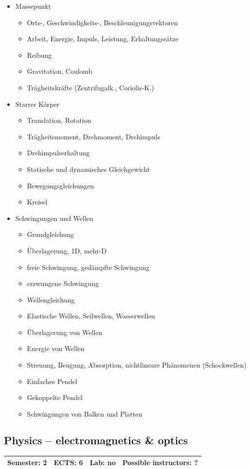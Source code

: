\documentclass[12pt,twoside,fleqn,a4paper]{article}
\begin{document}
\begin{itemize}
\setlength\itemsep{0cm}
\item Massepunkt
\begin{itemize}
\item Orts-, Geschwindigkeits-, Beschleunigungsvektoren
\item Arbeit, Energie, Impuls, Leistung, Erhaltungssätze
\item Reibung
\item Gravitation, Coulomb
\item Trägheitskräfte (Zentrifugalk., Coriolis-K.)
\end{itemize}

\item Starrer Körper
\begin{itemize}
\item Translation, Rotation
\item Trägheitsmoment, Drehmoment, Drehimpuls
\item Drehimpulserhaltung
\item Statische und dynamisches Gleichgewicht
\item Bewegungsgleichungen 
\item Kreisel
\end{itemize}

\item Schwingungen und Wellen
\begin{itemize}
\item Grundgleichung
\item Überlagerung, 1D, mehr-D
\item freie Schwingung, gedämpfte Schwingung
\item erzwungene Schwingung
\item Wellengleichung
\item Elastische Wellen, Seilwellen, Wasserwellen
\item Überlagerung von Wellen
\item Energie von Wellen
\item Streuung, Beugung, Absorption, nichtlineare Phänomenen (Schockwellen)
\item Einfaches Pendel
\item Gekoppelte Pendel
\item Schwingungen von Balken und Platten
\end{itemize}
\end{itemize}


\subsection{Physics -- electromagnetics \& optics}
\begin{tabular}{llll} \hline
\textbf{Semester:} 2 & \textbf{ECTS:} 6 & \textbf{Lab:} no & \textbf{Possible instructors:} ?\\
\hline
\end{tabular}
\end{document}
